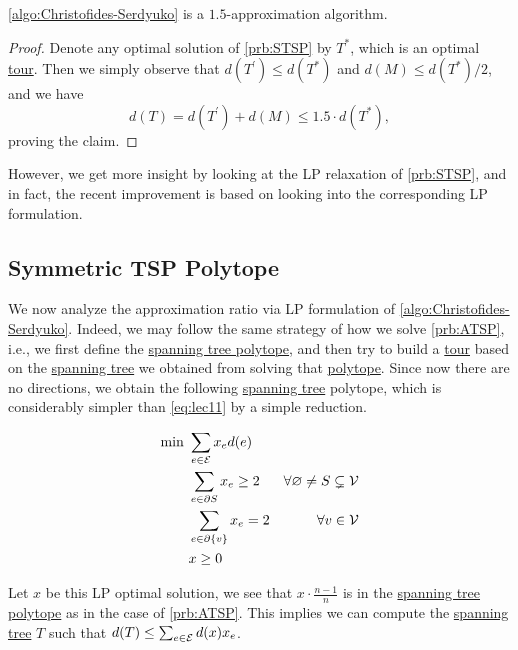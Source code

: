 \begin{theorem}\label{thm:lec12-2}
	\autoref{algo:Christofides-Serdyuko} is a \(1.5\)-approximation algorithm.
\end{theorem}
\begin{proof}
	Denote any optimal solution of \autoref{prb:STSP} by \(T^{\ast} \), which is an optimal \hyperref[def:tour]{tour}. Then we simply observe that \(d(T^\prime ) \leq d(T^{\ast} )\) and \(d(M) \leq d(T^{\ast} ) / 2\), and we have
	\[
		d(T) = d(T^\prime ) + d(M) \leq 1.5\cdot d(T^{\ast} ),
	\]
	proving the claim.
\end{proof}

However, we get more insight by looking at the LP relaxation of \autoref{prb:STSP}, and in fact, the recent improvement is based on looking into the corresponding LP formulation.

\subsection{Symmetric TSP Polytope}
We now analyze the approximation ratio via LP formulation of \autoref{algo:Christofides-Serdyuko}. Indeed, we may follow the same strategy of how we solve \autoref{prb:ATSP}, i.e., we first define the \hyperref[eq:lec12-1]{spanning tree polytope}, and then try to build a \hyperref[def:tour]{tour} based on the \hyperref[def:spanning-tree]{spanning tree} we obtained from solving that \hyperref[eq:lec12-1]{polytope}. Since now there are no directions, we obtain the following \hyperref[def:spanning-tree]{spanning tree} polytope, which is considerably simpler than \autoref{eq:lec11} by a simple reduction.

\begin{equation}\label{eq:lec12-1}
	\begin{aligned}
		\min~ & \sum_{e\in \mathcal{\MakeUppercase{e}} } x_e d(e)                                                                     \\
		      & \sum_{e\in \partial S} x_e \geq 2                 & \forall \varnothing \neq S \subsetneq \mathcal{\MakeUppercase{v}} \\
		      & \sum_{e\in \partial \{v\}} x_e = 2                & \forall v\in \mathcal{\MakeUppercase{v}}                          \\
		      & x \geq 0
	\end{aligned}
\end{equation}

Let \(x\) be this LP optimal solution, we see that \(x\cdot \frac{n-1}{n}\) is in the \hyperref[eq:lec12-1]{spanning tree polytope} as in the case of \autoref{prb:ATSP}. This implies we can compute the \hyperref[def:spanning-tree]{spanning tree} \(T\) such that \(d(T) \leq \sum_{e\in \mathcal{\MakeUppercase{e}} } d(x)x_e\).


